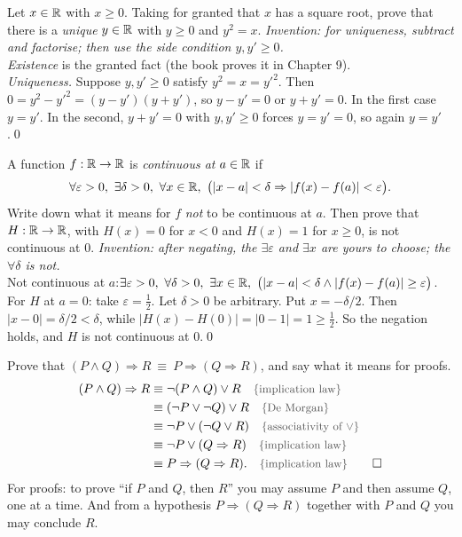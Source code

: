 \begin{bexample}
Let $x\in\mathbb{R}$ with $x\ge0$. Taking for granted that $x$ has a square root, prove that there is a \emph{unique} $y\in\mathbb{R}$ with $y\ge0$ and $y^2=x$.
\solution
\emph{Invention: for uniqueness, subtract and factorise; then use the side condition $y,y'\ge0$.}\\
\emph{Existence} is the granted fact (the book proves it in Chapter 9).\\
\emph{Uniqueness.} Suppose $y,y'\ge0$ satisfy $y^2=x=y'^2$. Then $0=y^2-y'^2=(y-y')(y+y')$, so $y-y'=0$ or $y+y'=0$. In the first case $y=y'$. In the second, $y+y'=0$ with $y,y'\ge0$ forces $y=y'=0$, so again $y=y'$.\qed
\end{bexample}

\begin{bexample}
A function $f:\mathbb{R}\to\mathbb{R}$ is \emph{continuous at} $a\in\mathbb{R}$ if
\[
\forall\varepsilon>0,\ \exists\delta>0,\ \forall x\in\R,\ \big(|x-a|<\delta\Rightarrow|f(x)-f(a)|<\varepsilon\big).
\]
Write down what it means for $f$ \emph{not} to be continuous at $a$. Then prove that $H:\mathbb{R}\to\mathbb{R}$, with $H(x)=0$ for $x<0$ and $H(x)=1$ for $x\ge0$, is not continuous at $0$.
\solution
\emph{Invention: after negating, the $\exists\varepsilon$ and $\exists x$ are yours to choose; the $\forall\delta$ is not.}\\
Not continuous at $a$:\quad $\exists\varepsilon>0,\ \forall\delta>0,\ \exists x\in\R,\ \big(|x-a|<\delta\wedge|f(x)-f(a)|\ge\varepsilon\big)$.\\
For $H$ at $a=0$: take $\varepsilon=\tfrac12$. Let $\delta>0$ be arbitrary. Put $x=-\delta/2$. Then $|x-0|=\delta/2<\delta$, while $|H(x)-H(0)|=|0-1|=1\ge\tfrac12$. So the negation holds, and $H$ is not continuous at $0$.\qed
\end{bexample}

\begin{bexample}
Prove that $(P\wedge Q)\Rightarrow R\ \equiv\ P\Rightarrow(Q\Rightarrow R)$, and say what it means for proofs.
\solution
\begin{align*}
(P\wedge Q)\Rightarrow R&\equiv\neg(P\wedge Q)\vee R\reason{implication law}\\
&\equiv(\neg P\vee\neg Q)\vee R\reason{De Morgan}\\
&\equiv\neg P\vee(\neg Q\vee R)\reason{associativity of $\vee$}\\
&\equiv\neg P\vee(Q\Rightarrow R)\reason{implication law}\\
&\equiv P\Rightarrow(Q\Rightarrow R).\reason{implication law}\qquad\square
\end{align*}
For proofs: to prove ``if $P$ and $Q$, then $R$'' you may assume $P$ and then assume $Q$, one at a time. And from a hypothesis $P\Rightarrow(Q\Rightarrow R)$ together with $P$ and $Q$ you may conclude $R$.
\end{bexample}

